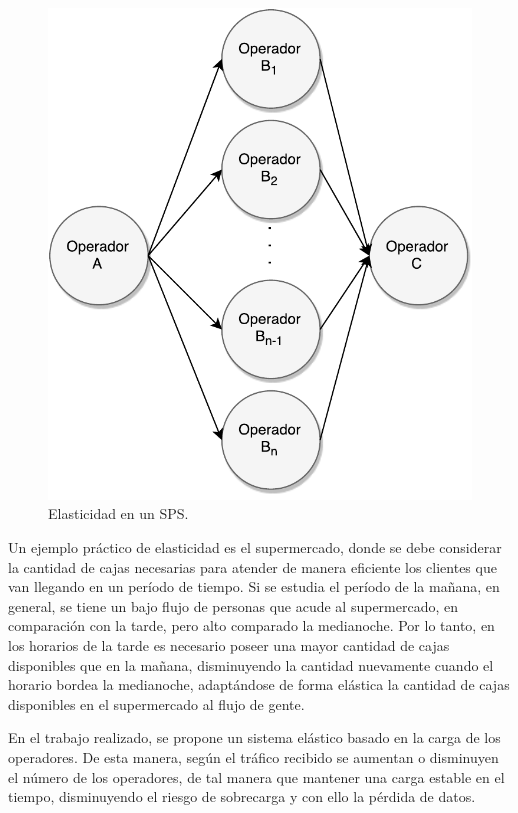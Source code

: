 \begin{figure}[!ht]
	\centering
	\includegraphics[scale=0.55]{images/Elasticidad.pdf}
	\caption{Elasticidad en un SPS.}
	\label{fig:elasticidad}
\end{figure}

Un ejemplo práctico de elasticidad es el supermercado, donde se debe considerar la cantidad de cajas necesarias para atender de manera eficiente los clientes que van llegando en un período de tiempo. Si se estudia el período de la mañana, en general, se tiene un bajo flujo de personas que acude al supermercado, en comparación con la tarde, pero alto comparado la medianoche. Por lo tanto, en los horarios de la tarde es necesario poseer una mayor cantidad de cajas disponibles que en la mañana, disminuyendo la cantidad nuevamente cuando el horario bordea la medianoche, adaptándose de forma elástica la cantidad de cajas disponibles en el supermercado al flujo de gente.

En el trabajo realizado, se propone un sistema elástico basado en la carga de los operadores. De esta manera, según el tráfico recibido se aumentan o disminuyen el número de los operadores, de tal manera que mantener una carga estable en el tiempo, disminuyendo el riesgo de sobrecarga y con ello la pérdida de datos.

